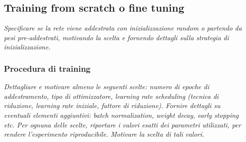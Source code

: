 \subsection{Training from scratch o fine tuning}
\emph{Specificare se la rete viene addestrata con inizializzazione random o partendo da pesi pre-addestrati, motivando la scelta e fornendo dettagli sulla strategia di inizializzazione.}

\subsubsection{Procedura di training}
{\em Dettagliare e motivare almeno le seguenti scelte: numero di epoche di addestramento, tipo di ottimizzatore, learning rate scheduling (tecnica di riduzione, learning rate iniziale, fattore di riduzione). Fornire dettagli su eventuali elementi aggiuntivi: batch normalization, weight decay, early stopping etc. Per ognuna delle scelte, riportare i valori esatti dei parametri utilizzati, per rendere l’esperimento riproducibile. Motivare la scelta di tali valori.}